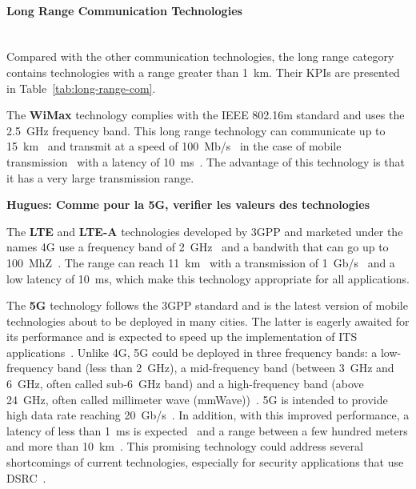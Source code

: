 \paragraph{Long Range Communication Technologies}\ \\

Compared with the other communication technologies, the long range category contains technologies with a range greater than 1~km. Their \acrshort{KPI}s are presented in Table~\ref{tab:long-range-com}.


The \textbf{\acrfull{WiMax}} technology complies with the IEEE 802.16m standard and uses the 2.5~GHz frequency band. This long range technology can communicate up to 15~km~\cite{selvarani_comparative_2014} and transmit at a speed of 100~Mb/s~\cite{anwer_survey_2014} in the case of mobile transmission~\cite{selvarani_comparative_2014} with a latency of 10~ms~\cite{msadaa_comparative_2010}. The advantage of this technology is that it has a very large transmission range.

{\bf Hugues: Comme pour la 5G, verifier les valeurs des technologies}

The \textbf{\acrfull{LTE}} and \textbf{\acrfull{LTE-A}} technologies developed by 3GPP and marketed under the names 4G use a frequency band of 2~GHz~\cite{seo_lte_2016} and a bandwith that can go up to 100~MhZ~\cite{araniti_lte_2013}. %
The range can reach 11~km~\cite{shah_5g_2018} with a transmission of 1~Gb/s~\cite{araniti_lte_2013} and a low latency of 10~ms, which make this technology appropriate for all applications. 

The \textbf{5G} technology follows the 3GPP standard and is the latest version of mobile technologies about to be deployed in many cities. The latter is eagerly awaited for its performance and is expected to speed up the implementation of ITS applications~\cite{foubert_long-range_2020}. Unlike 4G, 5G could be deployed in three frequency bands: a low-frequency band (less than 2~GHz), a mid-frequency band (between 3~GHz and 6~GHz, often called sub-6~GHz band) and a high-frequency band (above 24~GHz, often called millimeter wave (mmWave))~\cite{foubert_long-range_2020}. 5G is intended to provide high data rate reaching 20~Gb/s~\cite{hussain_integration_2019}.
In addition, with this improved performance, a latency of less than 1~ms is expected~\cite{hussain_integration_2019} and a range between a few hundred meters and more than 10~km~\cite{foubert_long-range_2020}. This promising technology could address several shortcomings of current technologies, especially for security applications that use \acrshort{DSRC}~\cite{shah_5g_2018}. 

